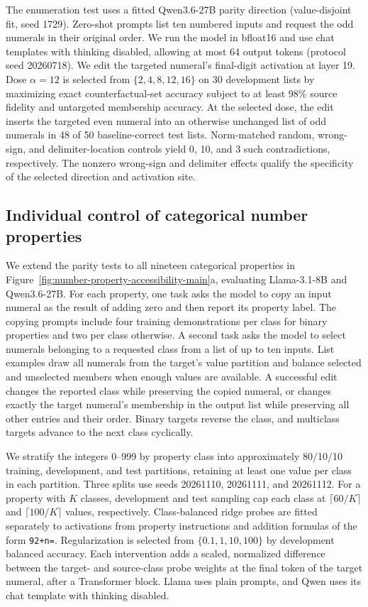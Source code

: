\documentclass[11pt]{article}
\begin{document}
The enumeration test uses a fitted Qwen3.6-27B parity direction (value-disjoint fit, seed 1729).
Zero-shot prompts list ten numbered inputs and request the odd numerals in their original order.
We run the model in bfloat16 and use chat templates with thinking disabled, allowing at most 64 output tokens (protocol seed 20260718).
We edit the targeted numeral's final-digit activation at layer 19.
Dose $\alpha=12$ is selected from $\{2,4,8,12,16\}$ on 30 development lists by maximizing exact counterfactual-set accuracy subject to at least 98\% source fidelity and untargeted membership accuracy.
At the selected dose, the edit inserts the targeted even numeral into an otherwise unchanged list of odd numerals in 48 of 50 baseline-correct test lists.
Norm-matched random, wrong-sign, and delimiter-location controls yield 0, 10, and 3 such contradictions, respectively.
The nonzero wrong-sign and delimiter effects qualify the specificity of the selected direction and activation site.

\subsection{Individual control of categorical number properties}
\label{sec:individual-property-control}

We extend the parity tests to all nineteen categorical properties in Figure~\ref{fig:number-property-accessibility-main}a, evaluating Llama-3.1-8B and Qwen3.6-27B.
For each property, one task asks the model to copy an input numeral as the result of adding zero and then report its property label.
The copying prompts include four training demonstrations per class for binary properties and two per class otherwise.
A second task asks the model to select numerals belonging to a requested class from a list of up to ten inputs.
List examples draw all numerals from the target's value partition and balance selected and unselected members when enough values are available.
A successful edit changes the reported class while preserving the copied numeral, or changes exactly the target numeral's membership in the output list while preserving all other entries and their order.
Binary targets reverse the class, and multiclass targets advance to the next class cyclically.

We stratify the integers 0--999 by property class into approximately 80/10/10 training, development, and test partitions, retaining at least one value per class in each partition.
Three splits use seeds 20261110, 20261111, and 20261112.
For a property with $K$ classes, development and test sampling cap each class at $\lceil60/K\rceil$ and $\lceil100/K\rceil$ values, respectively.
Class-balanced ridge probes are fitted separately to activations from property instructions and addition formulas of the form \texttt{92+n=}.
Regularization is selected from $\{0.1,1,10,100\}$ by development balanced accuracy.
Each intervention adds a scaled, normalized difference between the target- and source-class probe weights at the final token of the target numeral, after a Transformer block.
Llama uses plain prompts, and Qwen uses its chat template with thinking disabled.
\end{document}
